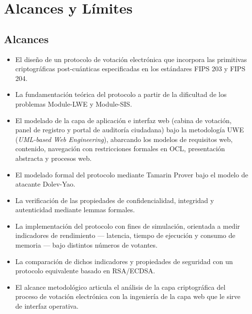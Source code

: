 \section{Alcances y Límites}
\label{sec:alcances_limites_tesis}

\subsection{Alcances}
\begin{itemize}
	\item El diseño de un protocolo de votación electrónica que incorpora las primitivas criptográficas post-cuánticas especificadas en los estándares FIPS 203 y FIPS 204.
	\item La fundamentación teórica del protocolo a partir de la dificultad de los problemas Module-LWE y Module-SIS.
	\item El modelado de la capa de aplicación e interfaz web (cabina de votación, panel de registro y portal de auditoría ciudadana) bajo la metodología UWE (\textit{UML-based Web Engineering}), abarcando los modelos de requisitos web, contenido, navegación con restricciones formales en OCL, presentación abstracta y procesos web.
	\item El modelado formal del protocolo mediante Tamarin Prover bajo el modelo de atacante Dolev-Yao.
	\item La verificación de las propiedades de confidencialidad, integridad y autenticidad mediante lemmas formales.
	\item La implementación del protocolo con fines de simulación, orientada a medir indicadores de rendimiento --- latencia, tiempo de ejecución y consumo de memoria --- bajo distintos números de votantes.
	\item La comparación de dichos indicadores y propiedades de seguridad con un protocolo equivalente basado en RSA/ECDSA.
	\item El alcance metodológico articula el análisis de la capa criptográfica del proceso de votación electrónica con la ingeniería de la capa web que le sirve de interfaz operativa.
\end{itemize}

